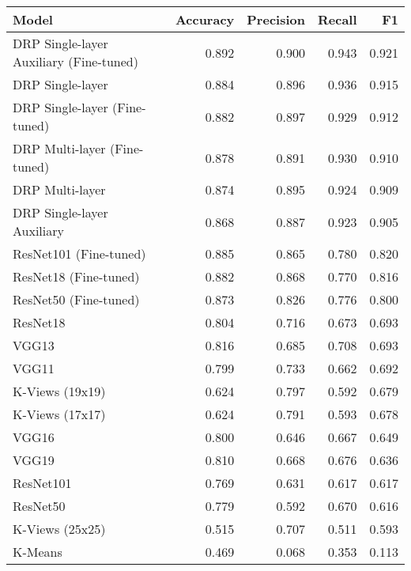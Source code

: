 \begin{tabular}{lrrrr}
    \toprule
    Model                                   & Accuracy & Precision & Recall & F1    \\
    \midrule
    DRP Single-layer Auxiliary (Fine-tuned) & 0.892    & 0.900     & 0.943  & 0.921 \\
    DRP Single-layer                        & 0.884    & 0.896     & 0.936  & 0.915 \\
    DRP Single-layer (Fine-tuned)           & 0.882    & 0.897     & 0.929  & 0.912 \\
    DRP Multi-layer (Fine-tuned)            & 0.878    & 0.891     & 0.930  & 0.910 \\
    DRP Multi-layer                         & 0.874    & 0.895     & 0.924  & 0.909 \\
    DRP Single-layer Auxiliary              & 0.868    & 0.887     & 0.923  & 0.905 \\
    ResNet101 (Fine-tuned)                  & 0.885    & 0.865     & 0.780  & 0.820 \\
    ResNet18 (Fine-tuned)                   & 0.882    & 0.868     & 0.770  & 0.816 \\
    ResNet50 (Fine-tuned)                   & 0.873    & 0.826     & 0.776  & 0.800 \\
    ResNet18                                & 0.804    & 0.716     & 0.673  & 0.693 \\
    VGG13                                   & 0.816    & 0.685     & 0.708  & 0.693 \\
    VGG11                                   & 0.799    & 0.733     & 0.662  & 0.692 \\
    K-Views (19x19)                         & 0.624    & 0.797     & 0.592  & 0.679 \\
    K-Views (17x17)                         & 0.624    & 0.791     & 0.593  & 0.678 \\
    VGG16                                   & 0.800    & 0.646     & 0.667  & 0.649 \\
    VGG19                                   & 0.810    & 0.668     & 0.676  & 0.636 \\
    ResNet101                               & 0.769    & 0.631     & 0.617  & 0.617 \\
    ResNet50                                & 0.779    & 0.592     & 0.670  & 0.616 \\
    K-Views (25x25)                         & 0.515    & 0.707     & 0.511  & 0.593 \\
    K-Means                                 & 0.469    & 0.068     & 0.353  & 0.113 \\
    \bottomrule
\end{tabular}
